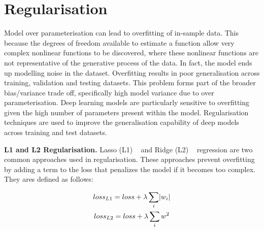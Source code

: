 
\section{Regularisation}

Model over parameterisation can lead to overfitting of in-sample data. This because the degrees of freedom available to estimate a function allow very complex nonlinear functions to be discovered, where these nonlinear functions are not representative of the generative process of the data. In fact, the model ends up modelling noise in the dataset. Overfitting results in poor generalisation across training, validation and testing datasets. This problem forms part of the broader bias/variance trade off, specifically high model variance due to over parameterisation. Deep learning models are particularly sensitive to overfitting given the high number of parameters present within the model. Regularisation techniques are used to improve the generalisation capability of deep models across training and test datasets. \bigskip

\textbf{L1 and L2 Regularisation.} Lasso (L1) ~\citep{tibshirani1996regression} and Ridge (L2) ~\citep{hoerl1970ridge} regression are two common approaches used in regularisation. These approaches prevent overfitting by adding a term to the loss that penalizes the model if it becomes too complex. They ares defined as follows:

\begin{subequations}
	\begin{gather}
		loss_{L1} = loss + \lambda\sum_i\abs{w_i}  \\
		loss_{L2} = loss + \lambda\sum_iw^2
	\end{gather}
\end{subequations}


